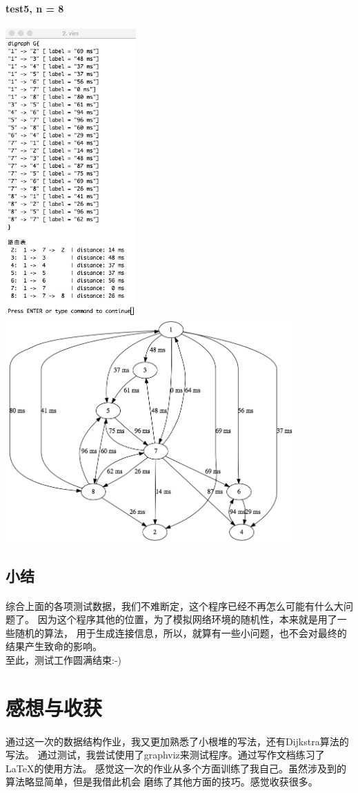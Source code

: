 \documentclass{article}
\begin{document}
		\paragraph{test5, n = 8}
			\begin{center}
			\includegraphics[width = 5cm]{data8.jpeg}
			\includegraphics[width = 11cm]{data8viz.jpeg}
			\end{center}
			\clearpage
	\subsection{小结}
		\paragraph{}
			综合上面的各项测试数据，我们不难断定，这个程序已经不再怎么可能有什么大问题了。
			因为这个程序其他的位置，为了模拟网络环境的随机性，本来就是用了一些随机的算法，
			用于生成连接信息，所以，就算有一些小问题，也不会对最终的结果产生致命的影响。 \\
			至此，测试工作圆满结束:-)
\section{感想与收获}
	\paragraph{}
		通过这一次的数据结构作业，我又更加熟悉了小根堆的写法，还有Dijkstra算法的写法。
		通过测试，我尝试使用了graphviz来测试程序。通过写作文档练习了\LaTeX{}的使用方法。
		感觉这一次的作业从多个方面训练了我自己。虽然涉及到的算法略显简单，但是我借此机会
		磨练了其他方面的技巧。感觉收获很多。
\end{document}
